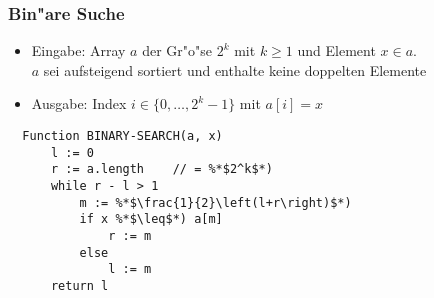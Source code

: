 \documentclass[t]{beamer}
\begin{document}
\begin{frame}[fragile]
  \frametitle{Bin"are Suche}
  \begin{itemize}
  \item Eingabe: Array $a$ der Gr"o"se $2^k$ mit $k \geq 1$ und Element
                 $x \in a$. \\ $a$ sei aufsteigend sortiert und enthalte
                 keine doppelten Elemente
  \item Ausgabe: Index $i \in \{0,\ldots,2^k-1\}$ mit $a[i] = x$
  \end{itemize}
  \begin{lstlisting}
  Function BINARY-SEARCH(a, x)
      l := 0
      r := a.length    // = %*$2^k$*)
      while r - l > 1
          m := %*$\frac{1}{2}\left(l+r\right)$*)
          if x %*$\leq$*) a[m]
              r := m
          else
              l := m
      return l
  \end{lstlisting}
\end{frame}
\end{document}
